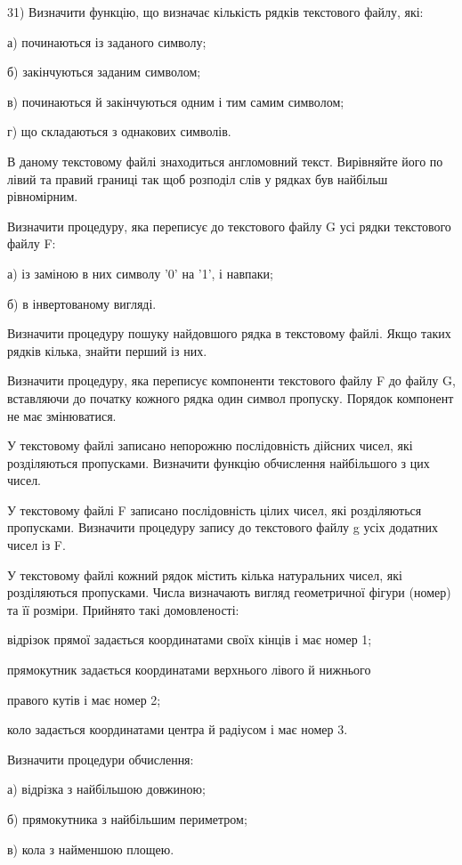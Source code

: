 \documentclass[]{article}
\begin{document}
31) Визначити функцію, що визначає кількість рядків текстового файлу,
які:

а) починаються із заданого символу;

б) закінчуються заданим символом;

в) починаються й закінчуються одним і тим самим символом;

г) що складаються з однакових символів.

В даному текстовому файлі знаходиться англомовний текст. Вирівняйте його
по лівий та правий границі так щоб розподіл слів у рядках був найбільш
рівномірним.

Визначити процедуру, яка переписує до текстового файлу G усі рядки
текстового файлу F:

а) із заміною в них символу '0' на '1', і навпаки;

б) в інвертованому вигляді.

Визначити процедуру пошуку найдовшого рядка в текстовому файлі. Якщо
таких рядків кілька, знайти перший із них.

Визначити процедуру, яка переписує компоненти текстового файлу F до
файлу G, вставляючи до початку кожного рядка один символ пропуску.
Порядок компонент не має змінюватися.

У текстовому файлі записано непорожню послідовність дійсних чисел, які
розділяються пропусками. Визначити функцію обчислення найбільшого з цих
чисел.

У текстовому файлі F записано послідовність цілих чисел, які
розділяються пропусками. Визначити процедуру запису до текстового файлу
g усіх додатних чисел із F.

У текстовому файлі кожний рядок містить кілька натуральних чисел, які
розділяються пропусками. Числа визначають вигляд геометричної фігури
(номер) та її розміри. Прийнято такі домовленості:

відрізок прямої задається координатами своїх кінців і має номер 1;

прямокутник задається координатами верхнього лівого й нижнього

правого кутів і має номер 2;

коло задається координатами центра й радіусом і має номер 3.

Визначити процедури обчислення:

а) відрізка з найбільшою довжиною;

б) прямокутника з найбільшим периметром;

в) кола з найменшою площею.
\end{document}
